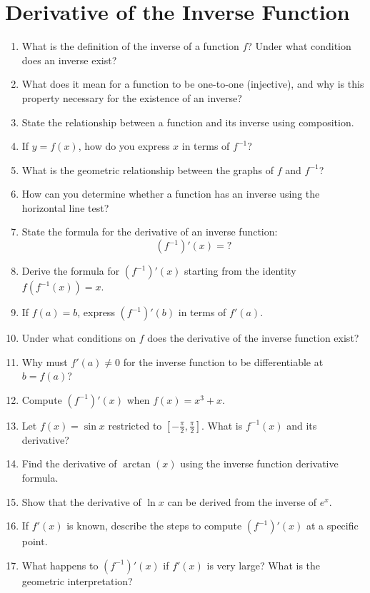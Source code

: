 \section{Derivative of the Inverse Function}

\begin{enumerate}
  \item What is the definition of the inverse of a function $f$? Under what condition does an inverse exist?
  \item What does it mean for a function to be one-to-one (injective), and why is this property necessary for the existence of an inverse?
  \item State the relationship between a function and its inverse using composition.
  \item If $y = f(x)$, how do you express $x$ in terms of $f^{-1}$?
  \item What is the geometric relationship between the graphs of $f$ and $f^{-1}$?
  \item How can you determine whether a function has an inverse using the horizontal line test?
  \item State the formula for the derivative of an inverse function: \[ (f^{-1})'(x) = ? \]
  \item Derive the formula for $\left(f^{-1}\right)'(x)$ starting from the identity $f(f^{-1}(x)) = x$.
  \item If $f(a) = b$, express $\left(f^{-1}\right)'(b)$ in terms of $f'(a)$.
  \item Under what conditions on $f$ does the derivative of the inverse function exist?
  \item Why must $f'(a) \neq 0$ for the inverse function to be differentiable at $b = f(a)$?
  \item Compute $\left(f^{-1}\right)'(x)$ when $f(x) = x^3 + x$.
  \item Let $f(x) = \sin x$ restricted to $\left[-\frac{\pi}{2}, \frac{\pi}{2}\right]$. What is $f^{-1}(x)$ and its derivative?
  \item Find the derivative of $\arctan(x)$ using the inverse function derivative formula.
  \item Show that the derivative of $\ln x$ can be derived from the inverse of $e^x$.
  \item If $f'(x)$ is known, describe the steps to compute $\left(f^{-1}\right)'(x)$ at a specific point.
  \item What happens to $\left(f^{-1}\right)'(x)$ if $f'(x)$ is very large? What is the geometric interpretation?

\end{enumerate}
